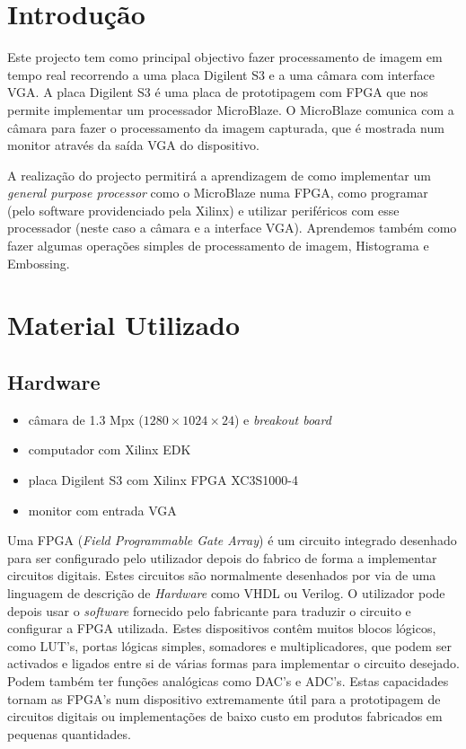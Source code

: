 \documentclass[a4paper,12pt]{article}
\begin{document}


\tableofcontents
\pagebreak

\section{Introdução}
Este projecto tem como principal objectivo fazer processamento de imagem em tempo real recorrendo a uma placa Digilent S3 e a uma câmara com interface VGA. A placa Digilent S3 é uma placa de prototipagem com FPGA que nos permite implementar um processador MicroBlaze. O MicroBlaze comunica com a câmara para fazer o processamento da imagem capturada, que é mostrada num monitor através da saída VGA do dispositivo.

A realização do projecto permitirá a aprendizagem de como implementar um \textit{general purpose processor} como o MicroBlaze numa FPGA, como programar (pelo software providenciado pela Xilinx\textregistered) e utilizar periféricos com esse processador (neste caso a câmara e a interface VGA). Aprendemos também como fazer algumas operações simples de processamento de imagem, Histograma e Embossing.


\section{Material Utilizado}
\subsection*{Hardware}
\begin{itemize}
\item câmara de 1.3 Mpx ($1280\times1024\times24$) e \textit{breakout board}
\item computador com Xilinx EDK
\item placa Digilent S3 com Xilinx FPGA XC3S1000-4
\item monitor com entrada VGA
\end{itemize}

Uma FPGA (\textit{Field Programmable Gate Array}) é um circuito integrado desenhado para ser configurado pelo utilizador depois do fabrico de forma a implementar circuitos digitais. Estes circuitos são normalmente desenhados por via de uma linguagem de descrição de \textit{Hardware} como VHDL ou Verilog. O utilizador pode depois usar o \textit{software} fornecido pelo fabricante para traduzir o circuito e configurar a FPGA utilizada. Estes dispositivos contêm muitos blocos lógicos, como LUT's, portas lógicas simples, somadores e multiplicadores, que podem ser activados e ligados entre si de várias formas para implementar o circuito desejado. Podem também ter funções analógicas como DAC's e ADC's. Estas capacidades tornam as FPGA's num dispositivo extremamente útil para a prototipagem de circuitos digitais ou implementações de baixo custo em produtos fabricados em pequenas quantidades.   
\end{document}
